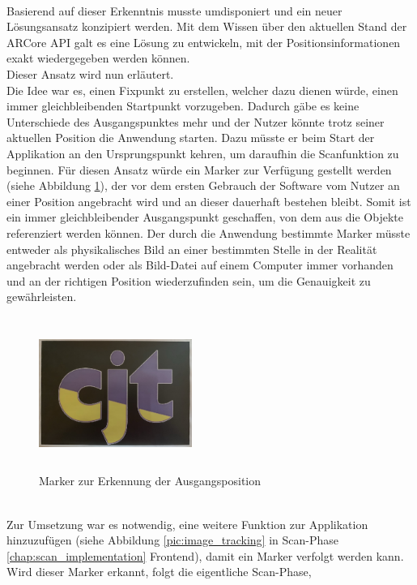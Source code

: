\\ 
Basierend auf dieser Erkenntnis musste umdisponiert und ein neuer Lösungsansatz konzipiert werden. Mit dem Wissen über den aktuellen Stand der ARCore \acs{API} 
galt es eine Lösung zu entwickeln, mit der Positionsinformationen exakt wiedergegeben werden können. 
\\ 
Dieser Ansatz wird nun erläutert.
\\ 
\linebreak
Die Idee war es, einen Fixpunkt zu erstellen, welcher dazu dienen würde, einen immer gleichbleibenden Startpunkt vorzugeben. Dadurch gäbe es keine Unterschiede des 
Ausgangspunktes mehr und der Nutzer könnte trotz seiner aktuellen Position die Anwendung starten. Dazu müsste er beim Start der Applikation an den Ursprungspunkt kehren, 
um daraufhin die Scanfunktion zu beginnen. Für diesen Ansatz würde ein Marker zur Verfügung gestellt werden (siehe Abbildung \ref{pic:initialMarker}), der vor dem ersten 
Gebrauch der Software vom Nutzer an einer Position angebracht wird und an dieser dauerhaft bestehen bleibt. Somit ist ein immer gleichbleibender Ausgangspunkt geschaffen, 
von dem aus die Objekte referenziert werden können. Der durch die Anwendung bestimmte Marker müsste entweder als physikalisches Bild an einer bestimmten Stelle in der Realität 
angebracht werden oder als Bild-Datei auf einem Computer immer vorhanden und an der richtigen Position wiederzufinden sein, um die Genauigkeit zu gewährleisten. 
\begin{figure}[hbt!]
    \centering
    \includegraphics[width=5cm,height=5cm,keepaspectratio]{4Umsetzung/Bilder/cjt_logo_tracking.png}
    \caption{Marker zur Erkennung der Ausgangsposition}
    \label{pic:initialMarker}
\end{figure}
\\
Zur Umsetzung war es notwendig, eine weitere Funktion zur Applikation hinzuzufügen (siehe Abbildung \ref{pic:image_tracking} 
in Scan-Phase \ref{chap:scan_implementation} Frontend), damit ein Marker verfolgt werden kann. Wird dieser Marker erkannt, folgt die eigentliche Scan-Phase, 
